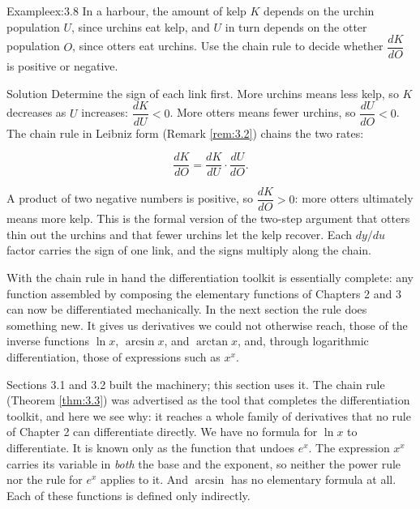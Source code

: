 \documentclass[a4paper,12pt,oneside]{memoir}
\begin{document}
\begin{workedexample}
\begin{envexample}{Example}{ex:3.8}{}
In a harbour, the amount of kelp \(K\) depends on the urchin population \(U\), since urchins eat kelp, and \(U\) in turn depends on the otter population \(O\), since otters eat urchins. Use the chain rule to decide whether \(\dfrac{dK}{dO}\) is positive or negative.
\end{envexample}
\begin{envsolution}{Solution}{}{}
Determine the sign of each link first. More urchins means less kelp, so \(K\) decreases as \(U\) increases: \(\dfrac{dK}{dU} < 0\). More otters means fewer urchins, so \(\dfrac{dU}{dO} < 0\). The chain rule in Leibniz form (Remark \ref{rem:3.2}) chains the two rates:

\[ \frac{dK}{dO} = \frac{dK}{dU}\cdot\frac{dU}{dO}. \]

A product of two negative numbers is positive, so \(\dfrac{dK}{dO} > 0\): more otters ultimately means more kelp. This is the formal version of the two-step argument that otters thin out the urchins and that fewer urchins let the kelp recover. Each \(dy/du\) factor carries the sign of one link, and the signs multiply along the chain.
\end{envsolution}
\end{workedexample}
With the chain rule in hand the differentiation toolkit is essentially complete: any function assembled by composing the elementary functions of Chapters 2 and 3 can now be differentiated mechanically. In the next section the rule does something new. It gives us derivatives we could not otherwise reach, those of the inverse functions \(\ln x\), \(\arcsin x\), and \(\arctan x\), and, through logarithmic differentiation, those of expressions such as \(x^{x}\).


Sections 3.1 and 3.2 built the machinery; this section uses it. The chain rule (Theorem \ref{thm:3.3}) was advertised as the tool that completes the differentiation toolkit, and here we see why: it reaches a whole family of derivatives that no rule of Chapter 2 can differentiate directly. We have no formula for \(\ln x\) to differentiate. It is known only as the function that undoes \(e^{x}\). The expression \(x^{x}\) carries its variable in \emph{both} the base and the exponent, so neither the power rule nor the rule for \(e^{x}\) applies to it. And \(\arcsin\) has no elementary formula at all. Each of these functions is defined only indirectly.
\end{document}
